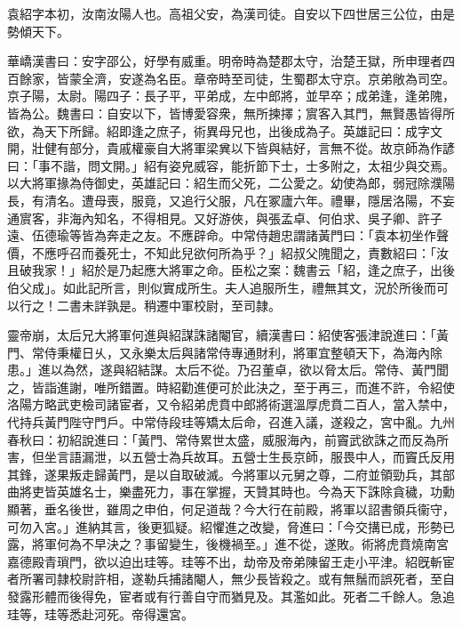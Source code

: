 
\begin{pinyinscope}
袁紹字本初，汝南汝陽人也。高祖父安，為漢司徒。自安以下四世居三公位，由是勢傾天下。

華嶠漢書曰：安字邵公，好學有威重。明帝時為楚郡太守，治楚王獄，所申理者四百餘家，皆蒙全濟，安遂為名臣。章帝時至司徒，生蜀郡太守京。京弟敞為司空。京子陽，太尉。陽四子：長子平，平弟成，左中郎將，並早卒；成弟逢，逢弟隗，皆為公。魏書曰：自安以下，皆博愛容衆，無所揀擇；賔客入其門，無賢愚皆得所欲，為天下所歸。紹即逢之庶子，術異母兄也，出後成為子。英雄記曰：成字文開，壯健有部分，貴戚權豪自大將軍梁兾以下皆與結好，言無不從。故京師為作諺曰：「事不諧，問文開。」紹有姿皃威容，能折節下士，士多附之，太祖少與交焉。以大將軍掾為侍御史，英雄記曰：紹生而父死，二公愛之。幼使為郎，弱冠除濮陽長，有清名。遭母喪，服竟，又追行父服，凡在冢廬六年。禮畢，隱居洛陽，不妄通賔客，非海內知名，不得相見。又好游俠，與張孟卓、何伯求、吳子卿、許子遠、伍德瑜等皆為奔走之友。不應辟命。中常侍趙忠謂諸黃門曰：「袁本初坐作聲價，不應呼召而養死士，不知此兒欲何所為乎？」紹叔父隗聞之，責數紹曰：「汝且破我家！」紹於是乃起應大將軍之命。臣松之案：魏書云「紹，逢之庶子，出後伯父成」。如此記所言，則似實成所生。夫人追服所生，禮無其文，況於所後而可以行之！二書未詳孰是。稍遷中軍校尉，至司隷。

靈帝崩，太后兄大將軍何進與紹謀誅諸閹官，續漢書曰：紹使客張津說進曰：「黃門、常侍秉權日乆，又永樂太后與諸常侍專通財利，將軍宜整頓天下，為海內除患。」進以為然，遂與紹結謀。太后不從。乃召董卓，欲以脅太后。常侍、黃門聞之，皆詣進謝，唯所錯置。時紹勸進便可於此決之，至于再三，而進不許，令紹使洛陽方略武吏檢司諸宦者，又令紹弟虎賁中郎將術選溫厚虎賁二百人，當入禁中，代持兵黃門陛守門戶。中常侍段珪等矯太后命，召進入議，遂殺之，宮中亂。九州春秋曰：初紹說進曰：「黃門、常侍累世太盛，威服海內，前竇武欲誅之而反為所害，但坐言語漏泄，以五營士為兵故耳。五營士生長京師，服畏中人，而竇氏反用其鋒，遂果叛走歸黃門，是以自取破滅。今將軍以元舅之尊，二府並領勁兵，其部曲將吏皆英雄名士，樂盡死力，事在掌握，天贊其時也。今為天下誅除貪穢，功勳顯著，垂名後世，雖周之申伯，何足道哉？今大行在前殿，將軍以詔書領兵衞守，可勿入宮。」進納其言，後更狐疑。紹懼進之改變，脅進曰：「今交搆已成，形勢已露，將軍何為不早決之？事留變生，後機禍至。」進不從，遂敗。術將虎賁燒南宮嘉德殿青瑣門，欲以迫出珪等。珪等不出，劫帝及帝弟陳留王走小平津。紹旣斬宦者所署司隷校尉許相，遂勒兵捕諸閹人，無少長皆殺之。或有無鬚而誤死者，至自發露形體而後得免，宦者或有行善自守而猶見及。其濫如此。死者二千餘人。急追珪等，珪等悉赴河死。帝得還宮。


\end{pinyinscope}
